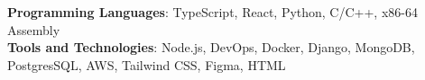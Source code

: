 \begin{itemize}[leftmargin=0in, label={}]
    \small{\item{
     \textbf{Programming Languages}{:  TypeScript, React, Python,  C/C++, x86-64 Assembly} \\
     \textbf{Tools and Technologies}{: Node.js, DevOps, Docker, Django, MongoDB,
     PostgresSQL, AWS, Tailwind
     CSS, Figma, HTML} \\
    }}
\end{itemize}